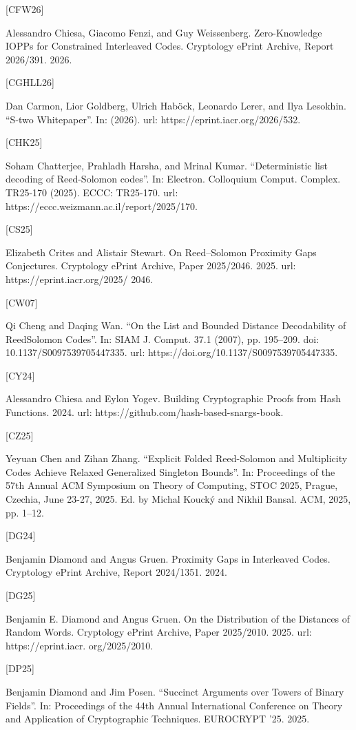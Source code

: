 \documentclass[11pt]{article}
\begin{document}
[CFW26]

Alessandro Chiesa, Giacomo Fenzi, and Guy Weissenberg. Zero-Knowledge IOPPs for Constrained Interleaved Codes. Cryptology ePrint Archive, Report 2026/391. 2026.

[CGHLL26]

Dan Carmon, Lior Goldberg, Ulrich Haböck, Leonardo Lerer, and Ilya Lesokhin. “S-two
Whitepaper”. In: (2026). url: https://eprint.iacr.org/2026/532.

[CHK25]

Soham Chatterjee, Prahladh Harsha, and Mrinal Kumar. “Deterministic list decoding of
Reed-Solomon codes”. In: Electron. Colloquium Comput. Complex. TR25-170 (2025). ECCC:
TR25-170. url: https://eccc.weizmann.ac.il/report/2025/170.

[CS25]

Elizabeth Crites and Alistair Stewart. On Reed–Solomon Proximity Gaps Conjectures. Cryptology ePrint Archive, Paper 2025/2046. 2025. url: https://eprint.iacr.org/2025/
2046.

[CW07]

Qi Cheng and Daqing Wan. “On the List and Bounded Distance Decodability of ReedSolomon Codes”. In: SIAM J. Comput. 37.1 (2007), pp. 195–209. doi: 10.1137/S0097539705447335.
url: https://doi.org/10.1137/S0097539705447335.

[CY24]

Alessandro Chiesa and Eylon Yogev. Building Cryptographic Proofs from Hash Functions.
2024. url: https://github.com/hash-based-snargs-book.

[CZ25]

Yeyuan Chen and Zihan Zhang. “Explicit Folded Reed-Solomon and Multiplicity Codes
Achieve Relaxed Generalized Singleton Bounds”. In: Proceedings of the 57th Annual ACM
Symposium on Theory of Computing, STOC 2025, Prague, Czechia, June 23-27, 2025. Ed.
by Michal Koucký and Nikhil Bansal. ACM, 2025, pp. 1–12.

[DG24]

Benjamin Diamond and Angus Gruen. Proximity Gaps in Interleaved Codes. Cryptology
ePrint Archive, Report 2024/1351. 2024.

[DG25]

Benjamin E. Diamond and Angus Gruen. On the Distribution of the Distances of Random
Words. Cryptology ePrint Archive, Paper 2025/2010. 2025. url: https://eprint.iacr.
org/2025/2010.

[DP25]

Benjamin Diamond and Jim Posen. “Succinct Arguments over Towers of Binary Fields”.
In: Proceedings of the 44th Annual International Conference on Theory and Application of
Cryptographic Techniques. EUROCRYPT ’25. 2025.
\end{document}
